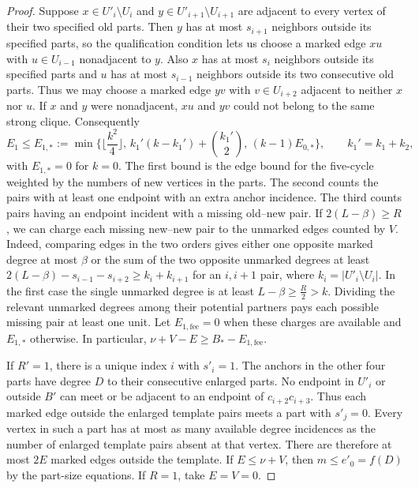 \documentclass[preprint,11pt,numbers]{elsarticle-arxiv}
\numberwithin{equation}{section}
\theoremstyle{definition}
\begin{document}
\begin{proof}
Suppose $x\in U'_i\setminus U_i$ and $y\in U'_{i+1}\setminus U_{i+1}$
are adjacent to every vertex of their two specified old parts.
Then $y$ has at most $s_{i+1}$ neighbors outside its specified parts,
so the qualification condition lets us choose a marked edge $xu$
with $u\in U_{i-1}$ nonadjacent to $y$. Also $x$ has at most $s_i$
neighbors outside its specified parts and $u$ has at most $s_{i-1}$
neighbors outside its two consecutive old parts. Thus we may choose a
marked edge $yv$ with $v\in U_{i+2}$ adjacent to neither $x$ nor $u$.
If $x$ and $y$ were nonadjacent, $xu$ and $yv$ could not belong to
the same strong clique. Consequently
\[
 E_1\leq E_{1,*}:=\min\{\lfloor \frac{k^2}{4}\rfloor,\,
 k_1' (k-k_1')+\binom{k_1'}{2},\,(k-1)E_{0,*}\},
 \qquad k_1'=k_1+k_2 ,
\]
with $E_{1,*}=0$ for $k=0$. The first bound is the edge bound for the
five-cycle weighted by the numbers of new vertices in the parts.
The second counts the pairs with at least one endpoint with an extra
anchor incidence. The third counts pairs having an endpoint incident
with a missing old--new pair. If $2(L-\beta)\geq R$, we can charge
each missing new--new pair to the unmarked edges counted by $V$.
Indeed, comparing edges in
the two orders gives either one opposite marked degree at most $\beta$ or
the sum of the two opposite unmarked degrees at least
$2(L-\beta)-s_{i-1}-s_{i+2}\geq k_i+k_{i+1}$ for an $i,i+1$ pair,
where $k_i=|U'_i\setminus U_i|$. In the first case the single unmarked
degree is at least $L-\beta\geq \frac{R}{2}>k$. Dividing the relevant unmarked
degrees among their potential partners pays each possible missing
pair at least one unit. Let $E_{1,\mathrm{fee}}=0$ when these charges
are available and $E_{1,*}$ otherwise. In particular,
$\nu+V-E\geq B_*-E_{1,\mathrm{fee}}$.

If $R'=1$, there is a unique index $i$ with $s'_i=1$. The anchors
in the other four parts have degree $D$ to their consecutive enlarged
parts. No endpoint in $U'_i$ or outside $B'$ can meet or be adjacent
to an endpoint of $c_{i+2}c_{i+3}$. Thus each marked edge outside the
enlarged template pairs meets a part with $s'_j=0$. Every vertex in
such a part has at most as many available degree incidences as the
number of enlarged template pairs absent at that vertex. There are
therefore at most $2E$ marked edges outside the template.
If $E\leq \nu+V$, then $m\leq e'_0=f(D)$ by the part-size equations.
If $R=1$, take $E=V=0$.


\end{proof}
\end{document}
